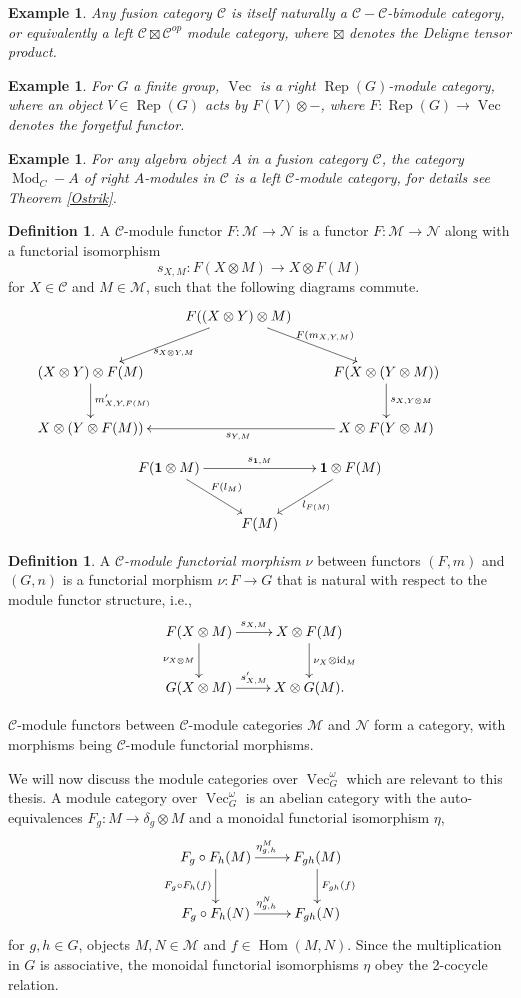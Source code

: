 \documentclass[11pt]{book}
\theoremstyle{Rem}
\newtheorem{Expl}[theorem]{Example}
\theoremstyle{definition}
\newtheorem{Def}[theorem]{Definition}
\numberwithin{equation}{section}
\newcommand\id{\operatorname{id}}
\newcommand\ot{\otimes}
\newcommand\Rep{\operatorname{Rep}}
\newcommand\Vect{\operatorname{Vec}}
\newcommand\Hom{\operatorname{Hom}}
\newcommand\Mod{\operatorname{Mod}}
\newcommand\M{\mathcal{M}}
\newcommand\NN{\mathcal{N}}
\newcommand\C{\mathcal C}
\newcommand\one{\mathbf{1}}
\begin{document}
\begin{Expl}\rm
Any fusion category $\C$ is itself naturally a $\C-\C$-bimodule category, or equivalently a left $\C \boxtimes \C^{op}$ module category, where $\boxtimes$ denotes the Deligne tensor product. 
\end{Expl}
\begin{Expl}\rm
For $G$ a finite group, $\Vect$ is a right $\Rep(G)$-module category, where an object $V\in \Rep(G)$ acts by $F(V)\otimes -$, where $F:\Rep(G)\rightarrow \Vect$ denotes the forgetful functor. 
\end{Expl}
\begin{Expl}\rm
For any algebra object $A$ in a fusion category  $\C$, the category $\Mod_C-A$ of right $A$-modules in $\C$ is a left $\C$-module category, for details see Theorem \ref{Ostrik}.
\end{Expl}
\begin{Def}
A $\C$-module functor $F:\M\rightarrow \NN$ is a functor $F:\M\rightarrow \NN$ along with a functorial isomorphism \begin{equation}
	s_{X, M}: F(X\otimes M) \rightarrow X\otimes F(M)  
\end{equation} for $X\in \C$ and $M\in \M$, such that the following diagrams commute. 
\[
\xymatrix{
& F((X\ot Y) \ot M) \ar[rd]^{F(m_{X, Y, M})} \ar[ld]^{s_{X\ot Y, M}}& \\
(X\ot Y) \ot F(M) \ar[d]^{m'_{X, Y, F(M)}} & &  F(X \ot (Y\ot M))\ar[d]^{s_{X, Y\ot M}} & \\
X\ot (Y \ot F(M))& & X \ot F(Y\ot M)\ar[ll]^{s_{Y, M}} }
\]
\[
\xymatrix{F(\one\ot M) \ar[rr]^{s_{\one, M}} \ar[rd]^{F(l_M)}& &  \one \ot F(M)\ar[ld]^{l_{F(M)}}\\
& F(M) & }
\]
\end{Def}
\begin{Def}
A \textit{ $\C$-module functorial morphism} $\nu$ between functors $(F,m)$ and $(G, n)$ is a functorial morphism $\nu:F\rightarrow G$ that is natural with respect to the module functor structure, i.e., \[
	\xymatrix{
  	F(X\otimes M) \ar[d]_{\nu_{X\otimes M}}\ar[r]^{s_{X, M}} & X\otimes F(M)\ar[d]^{\nu_X \otimes \id_M}\\
   G(X\otimes M)	 \ar[r]^{s'_{X, M}} & X\otimes G(M).}			
\]

\end{Def}
$\C$-module functors between $\C$-module categories $\M$ and $\NN$ form a category, with morphisms being $\C$-module functorial morphisms.

We will now discuss the module categories over $\Vect^\omega_G$ which are relevant to this thesis. A module category over $\Vect^\omega_G$ is an abelian category with the auto-equivalences $F_g:M\rightarrow \delta_g \otimes M$ and a monoidal functorial isomorphism $\eta$, \begin{equation}
	\xymatrix{F_g\circ F_h (M) \ar[r]^{\eta_{g,h}^M}\ar[d]_{F_g\circ F_h(f)} & F_{gh}(M) \ar[d]^{F_{gh}(f)} \\
	F_g\circ F_h(N) \ar[r]^{\eta_{g,h}^N} & F_{gh}(N)} 
\end{equation} for $g,h \in G$, objects $M, N \in \M$ and $f\in \Hom(M, N)$. Since the multiplication in $G$ is associative, the monoidal functorial isomorphisms $\eta$ obey the 2-cocycle relation.
\end{document}
